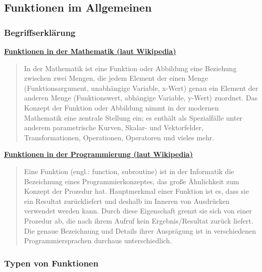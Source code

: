 
\subsection{Funktionen im Allgemeinen}

\subsubsection{\texorpdfstring{{Begriffserklärung}}{Begriffserklärung}}

\par\noindent\textbf{\href{http://de.wikipedia.org/wiki/Funktion\%20(Mathematik)}{Funktionen
in der Mathematik (laut Wikipedia)}}

\begin{quote}
In der Mathematik ist eine Funktion oder Abbildung eine Beziehung
zwischen zwei Mengen, die jedem Element der einen Menge
(Funktionsargument, unabhängige Variable, x-Wert) genau ein Element der
anderen Menge (Funktionswert, abhängige Variable, y-Wert) zuordnet. Das
Konzept der Funktion oder Abbildung nimmt in der modernen Mathematik
eine zentrale Stellung ein; es enthält als Spezialfälle unter anderem
parametrische Kurven, Skalar- und Vektorfelder, Transformationen,
Operationen, Operatoren und vieles mehr.
\end{quote}



\par\noindent\textbf{\href{http://de.wikipedia.org/wiki/Funktion\%20(Programmierung)}{Funktionen
in der Programmierung (laut Wikipedia)}}

\begin{quote}
Eine Funktion (engl.: function, subroutine) ist in der Informatik die
Bezeichnung eines Programmierkonzeptes, das große Ähnlichkeit zum
Konzept der Prozedur hat. Hauptmerkmal einer Funktion ist es, dass sie
ein Resultat zurückliefert und deshalb im Inneren von Ausdrücken
verwendet werden kann. Durch diese Eigenschaft grenzt sie sich von einer
Prozedur ab, die nach ihrem Aufruf kein Ergebnis/Resultat zurück
liefert. Die genaue Bezeichnung und Details ihrer Ausprägung ist in
verschiedenen Programmiersprachen durchaus unterschiedlich.
\end{quote}



\subsubsection{\texorpdfstring{{Typen von
Funktionen}}{Typen von Funktionen}}

